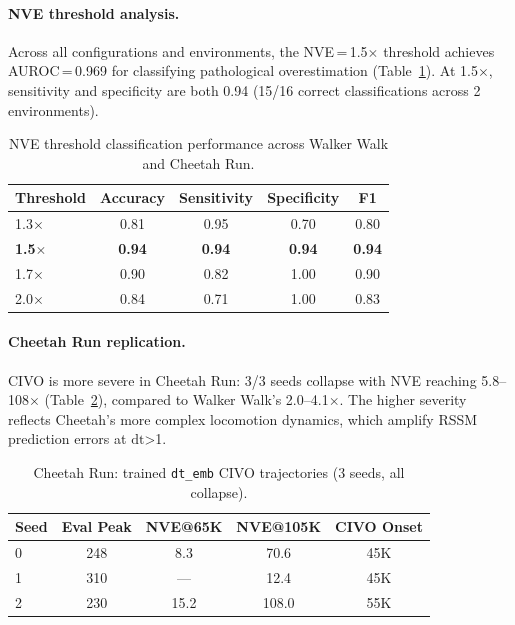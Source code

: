 \documentclass{article}
\newcommand{\dt}{\mathrm{dt}}
\begin{document}
\paragraph{NVE threshold analysis.}
Across all configurations and environments, the NVE\,=\,1.5$\times$ threshold achieves AUROC\,=\,0.969 for classifying pathological overestimation (Table~\ref{tab:nve-threshold}).
At 1.5$\times$, sensitivity and specificity are both 0.94 (15/16 correct classifications across 2 environments).

\begin{table}[h]
\centering
\caption{NVE threshold classification performance across Walker Walk and Cheetah Run.}
\label{tab:nve-threshold}
\begin{tabular}{lcccc}
\toprule
\textbf{Threshold} & \textbf{Accuracy} & \textbf{Sensitivity} & \textbf{Specificity} & \textbf{F1} \\
\midrule
1.3$\times$ & 0.81 & 0.95 & 0.70 & 0.80 \\
\textbf{1.5$\times$} & \textbf{0.94} & \textbf{0.94} & \textbf{0.94} & \textbf{0.94} \\
1.7$\times$ & 0.90 & 0.82 & 1.00 & 0.90 \\
2.0$\times$ & 0.84 & 0.71 & 1.00 & 0.83 \\
\bottomrule
\end{tabular}
\end{table}

\paragraph{Cheetah Run replication.}
CIVO is more severe in Cheetah Run: 3/3 seeds collapse with NVE reaching 5.8--108$\times$ (Table~\ref{tab:cheetah-civo}), compared to Walker Walk's 2.0--4.1$\times$.
The higher severity reflects Cheetah's more complex locomotion dynamics, which amplify RSSM prediction errors at $\dt$>1.

\begin{table}[h]
\centering
\caption{Cheetah Run: trained \texttt{dt\_emb} CIVO trajectories (3 seeds, all collapse).}
\label{tab:cheetah-civo}
\begin{tabular}{lcccc}
\toprule
\textbf{Seed} & \textbf{Eval Peak} & \textbf{NVE@65K} & \textbf{NVE@105K} & \textbf{CIVO Onset} \\
\midrule
0 & 248 & 8.3 & 70.6 & 45K \\
1 & 310 & --- & 12.4 & 45K \\
2 & 230 & 15.2 & 108.0 & 55K \\
\bottomrule
\end{tabular}
\end{table}
\end{document}

